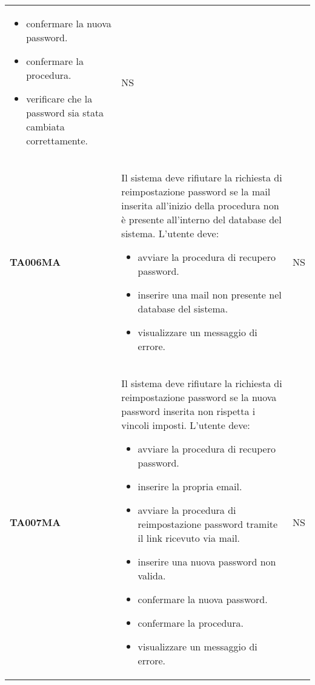 \documentclass[../piano-di-qualifica.tex]{subfiles}
\begin{document}
\begin{longtable}[H]{>{\centering\bfseries}m{3cm} >{}m{10cm} >{\centering\arraybackslash}m{3cm}}
\begin{itemize}
    \item confermare la nuova password.
    \item confermare la procedura.
    \item verificare che la password sia stata cambiata correttamente.
  \end{itemize}
                    & NS                                                                                                                                                                                                                                                               \\
  TA006MA           & Il sistema deve rifiutare la richiesta di reimpostazione password se la mail inserita all'inizio della procedura non è presente all'interno del database del sistema. \newline
  L'utente deve:
  \begin{itemize}
    \item avviare la procedura di recupero password.
    \item inserire una mail non presente nel database del sistema.
    \item visualizzare un messaggio di errore.
  \end{itemize}
                    & NS                                                                                                                                                                                                                                                               \\
  TA007MA           & Il sistema deve rifiutare la richiesta di reimpostazione password se la nuova password inserita non rispetta i vincoli imposti. \newline
  L'utente deve:
  \begin{itemize}
    \item avviare la procedura di recupero password.
    \item inserire la propria email.
    \item avviare la procedura di reimpostazione password tramite il link ricevuto via mail.
    \item inserire una nuova password non valida.
    \item confermare la nuova password.
    \item confermare la procedura.
    \item visualizzare un messaggio di errore.
  \end{itemize}
                    & NS                                                                                                                                                                                                                                                               \\

\end{longtable}
\end{document}
